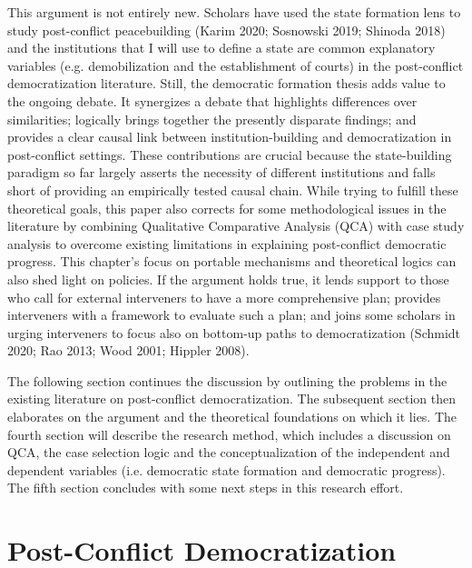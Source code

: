 \documentclass [11pt]{article}
\begin{document}
This argument is not entirely new. Scholars have used the state formation lens to study post-conflict peacebuilding (Karim 2020; Sosnowski 2019; Shinoda 2018) and the institutions that I will use to define a state are common explanatory variables (e.g. demobilization and the establishment of courts) in the post-conflict democratization literature. Still, the democratic formation thesis adds value to the ongoing debate. It synergizes a debate that highlights differences over similarities; logically brings together the presently disparate findings; and provides a clear causal link between institution-building and democratization in post-conflict settings. These contributions are crucial because the state-building paradigm so far largely asserts the necessity of different institutions and falls short of providing an empirically tested causal chain. While trying to fulfill these theoretical goals, this paper also corrects for some methodological issues in the literature by combining Qualitative Comparative Analysis (QCA) with case study analysis to overcome existing limitations in explaining post-conflict democratic progress. This chapter's focus on portable mechanisms and theoretical logics can also shed light on policies. If the argument holds true, it lends support to those who call for external interveners to have a more comprehensive plan; provides interveners with a framework to evaluate such a plan; and joins some scholars in urging interveners to focus also on bottom-up paths to democratization (Schmidt 2020; Rao 2013; Wood 2001; Hippler 2008).

The following section continues the discussion by outlining the problems in the existing literature on post-conflict democratization. The subsequent section then elaborates on the argument and the theoretical foundations on which it lies. The fourth section will describe the research method, which includes a discussion on QCA, the case selection logic and the conceptualization of the independent and dependent variables (i.e. democratic state formation and democratic progress). The fifth section concludes with some next steps in this research effort.


\section*{Post-Conflict Democratization}
\end{document}
